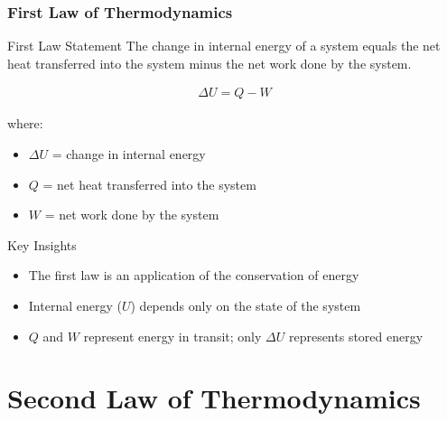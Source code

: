 \documentclass{beamer}
\begin{document}
\begin{frame}
    \frametitle{First Law of Thermodynamics}
    \begin{alertblock}{First Law Statement}
        The change in internal energy of a system equals the net heat transferred into the system minus the net work done by the system.
        
        \begin{align*}
            \Delta U = Q - W
        \end{align*}
        
        where:
        \begin{itemize}
            \item $\Delta U$ = change in internal energy
            \item $Q$ = net heat transferred into the system
            \item $W$ = net work done by the system
        \end{itemize}
    \end{alertblock}
    \end{frame}

\begin{frame}
    \begin{block}{Key Insights}
        \begin{itemize}
            \item The first law is an application of the conservation of energy
            \item Internal energy ($U$) depends only on the state of the system
            \item $Q$ and $W$ represent energy in transit; only $\Delta U$ represents stored energy
        \end{itemize}
    \end{block}
\end{frame}

\section{Second Law of Thermodynamics}
\end{document}

